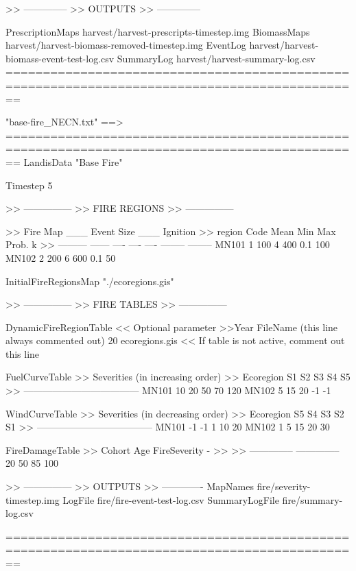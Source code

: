 >> --------------
>> OUTPUTS
>> --------------

PrescriptionMaps    harvest/harvest-prescripts-{timestep}.img
BiomassMaps         harvest/harvest-biomass-removed-{timestep}.img
EventLog            harvest/harvest-biomass-event-test-log.csv
SummaryLog	    harvest/harvest-summary-log.csv
==============================================================================================



"base-fire_NECN.txt" ==>
==============================================================================================
LandisData  "Base Fire"

Timestep  5

>> ---------------
>> FIRE REGIONS
>> ---------------

>> Fire        Map	___ Event Size ___   Ignition  
>> region      Code	 Mean  Min    Max    Prob.     k
>> ---------   ------	----   ----   ----   --------  --------
    MN101       1	 100    4     400    0.1    100
    MN102       2	 200    6     600    0.1     50

InitialFireRegionsMap	"./ecoregions.gis"


>> ---------------
>> FIRE TABLES
>> ---------------

  DynamicFireRegionTable  << Optional parameter
>>Year	FileName  (this line always commented out)
  20	ecoregions.gis  << If table is not active, comment out this line


  FuelCurveTable
>>             Severities (in increasing order)
>> Ecoregion   S1   S2   S3   S4   S5
>> ------------------------------------
    MN101       10   20   50   70   120
    MN102        5   15   20   -1    -1


  WindCurveTable
>>             Severities (in decreasing order)
>> Ecoregion   S5   S4   S3   S2   S1
>> ------------------------------------
    MN101       -1   -1    1   10   20
    MN102        1    5   15   20   30


  FireDamageTable
>> Cohort Age       FireSeverity - 
>> %
>> --------------   --------------
     20%
     50%
     85%
    100%


>> ---------------
>> OUTPUTS
>> -------------
MapNames  	fire/severity-{timestep}.img
LogFile   	fire/fire-event-test-log.csv
SummaryLogFile 	fire/summary-log.csv

==============================================================================================





